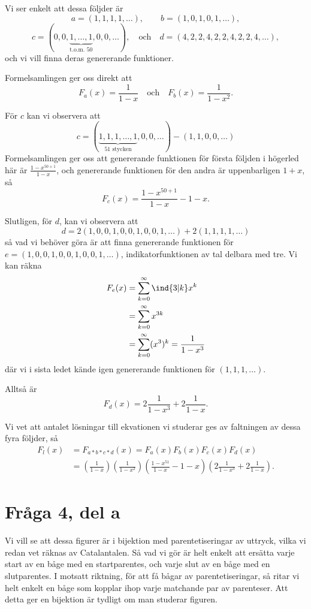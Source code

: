 \documentclass[nobib]{tufte-handout}
\begin{document}
Vi ser enkelt att dessa följder är
$$a = (1,1,1,1,\ldots),\qquad b = (1,0,1,0,1,\ldots),$$
$$c = (0,0,\underbrace{1,\ldots,1}_{\text{t.o.m. }50},0,0,\ldots), \quad\text{och}\quad d = (4,2,2,4,2,2,4,2,2,4,\ldots),$$
och vi vill finna deras genererande funktioner.

Formelsamlingen ger oss direkt att
$$F_a(x) = \frac{1}{1-x}\quad\text{och}\quad F_b(x) = \frac{1}{1 - x^2}.$$

För $c$ kan vi observera att 
$$c = (\underbrace{1,1,1,\ldots,1}_{51\text{ stycken}},0,0,\ldots) - (1,1,0,0,\ldots)$$
Formelsamlingen ger oss att genererande funktionen för första följden i högerled här är $\frac{1 - x^{50+1}}{1-x}$, och genererande funktionen för den andra är uppenbarligen $1 + x$, så
$$F_c(x) = \frac{1 - x^{50+1}}{1-x} - 1 - x.$$

Slutligen, för $d$, kan vi observera att
$$d = 2(1,0,0,1,0,0,1,0,0,1,\ldots) + 2(1,1,1,1,\ldots)$$
så vad vi behöver göra är att finna genererande funktionen för $e = (1,0,0,1,0,0,1,0,0,1,\ldots)$, indikatorfunktionen av tal delbara med tre. Vi kan räkna
\begin{align*}
  F_{e}(x) &= \sum_{k=0}^{\infty} \ind{3|k} x^k\\
  &= \sum_{k=0}^{\infty} x^{3k}\\
  &= \sum_{k=0}^{\infty} (x^3)^k = \frac{1}{1-x^3}
\end{align*}
där vi i sista ledet kände igen genererande funktionen för $(1,1,1,\ldots)$.

Alltså är
$$F_d(x) = 2\frac{1}{1 - x^3} + 2\frac{1}{1 - x}.$$

Vi vet att antalet lösningar till ekvationen vi studerar ges av faltningen av dessa fyra följder, så
\begin{align*}
  F_l(x) &= F_{a * b * c * d}(x) = F_a(x)F_b(x)F_c(x)F_d(x)\\
  &= \left(\frac{1}{1-x}\right)\left(\frac{1}{1-x^2}\right)\left(\frac{1 - x^{51}}{1-x} - 1 - x\right)\left(2\frac{1}{1 - x^3} + 2\frac{1}{1 - x}\right).
\end{align*}

\section{Fråga 4, del a}

Vi vill se att dessa figurer är i bijektion med parentetiseringar av uttryck, vilka vi redan vet räknas av Catalantalen. Så vad vi gör är helt enkelt att ersätta varje start av en båge med en startparentes, och varje slut av en båge med en slutparentes. I motsatt riktning, för att få bågar av parentetiseringar, så ritar vi helt enkelt en båge som kopplar ihop varje matchande par av parenteser. Att detta ger en bijektion är tydligt om man studerar figuren.
\end{document}
